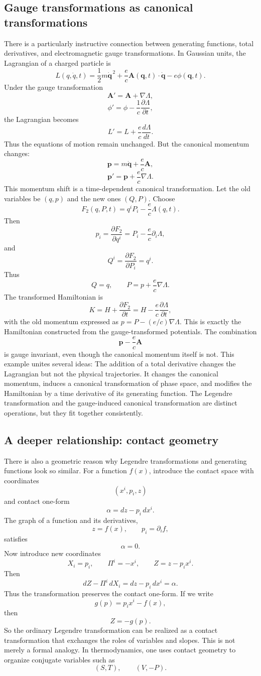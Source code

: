 \subsection{Gauge transformations as canonical transformations}
There is a particularly instructive connection between generating functions,
total derivatives, and electromagnetic gauge transformations.
In Gaussian units, the Lagrangian of a charged particle is
\[
L(q,\dot q,t)
=
\frac12m\dot{\mathbf q}^{\,2}
+\frac ec\mathbf A(\mathbf q,t)\cdot\dot{\mathbf q}
-e\phi(\mathbf q,t).
\]
Under the gauge transformation
\[
\mathbf A'=\mathbf A+\nabla\Lambda,
\]
\[
\phi'=\phi-\frac1c\frac{\partial\Lambda}{\partial t},
\]
the Lagrangian becomes
\[
L'=L+\frac ec\frac{d\Lambda}{dt}.
\]
Thus the equations of motion remain unchanged.
But the canonical momentum changes:
\[
\mathbf p=m\dot{\mathbf q}+\frac ec\mathbf A,
\]
\[
\boxed{
\mathbf p'=\mathbf p+\frac ec\nabla\Lambda.
}
\]
This momentum shift is a time-dependent canonical transformation.
Let the old variables be \((q,p)\) and the new ones \((Q,P)\). Choose
\[
\boxed{
F_2(q,P,t)
=q^iP_i-\frac ec\Lambda(q,t).
}
\]
Then
\[
p_i=\frac{\partial F_2}{\partial q^i}
=P_i-\frac ec\partial_i\Lambda,
\]
and
\[
Q^i=\frac{\partial F_2}{\partial P_i}=q^i.
\]
Thus
\[
\boxed{
Q=q,\qquad
P=p+\frac ec\nabla\Lambda.
}
\]
The transformed Hamiltonian is
\[
K=H+\frac{\partial F_2}{\partial t}
=H-\frac ec\frac{\partial\Lambda}{\partial t},
\]
with the old momentum expressed as \(p=P-(e/c)\nabla\Lambda\).
This is exactly the Hamiltonian constructed from the gauge-transformed
potentials.
The combination
\[
\mathbf p-\frac ec\mathbf A
\]
is gauge invariant, even though the canonical momentum itself is not.
This example unites several ideas:
The addition of a total derivative changes the Lagrangian but not the physical
trajectories. It changes the canonical momentum, induces a canonical
transformation of phase space, and modifies the Hamiltonian by a time
derivative of its generating function.
The Legendre transformation and the gauge-induced canonical transformation are
distinct operations, but they fit together consistently.

\subsection{A deeper relationship: contact geometry}
There is also a geometric reason why Legendre transformations and generating
functions look so similar.
For a function \(f(x)\), introduce the contact space with coordinates
\[
(x^i,p_i,z)
\]
and contact one-form
\[
\boxed{\alpha=dz-p_i\,dx^i.}
\]
The graph of a function and its derivatives,
\[
z=f(x),\qquad p_i=\partial_i f,
\]
satisfies
\[
\alpha=0.
\]
Now introduce new coordinates
\[
X_i=p_i,\qquad
\Pi^i=-x^i,\qquad
Z=z-p_ix^i.
\]
Then
\[
dZ-\Pi^i\,dX_i
=
dz-p_i\,dx^i
=\alpha.
\]
Thus the transformation preserves the contact one-form.
If we write
\[
g(p)=p_ix^i-f(x),
\]
then
\[
Z=-g(p).
\]
So the ordinary Legendre transformation can be realized as a contact
transformation that exchanges the roles of variables and slopes.
This is not merely a formal analogy.
In thermodynamics, one uses contact geometry to organize conjugate variables such as
\[
(S,T),\qquad (V,-P).
\]

